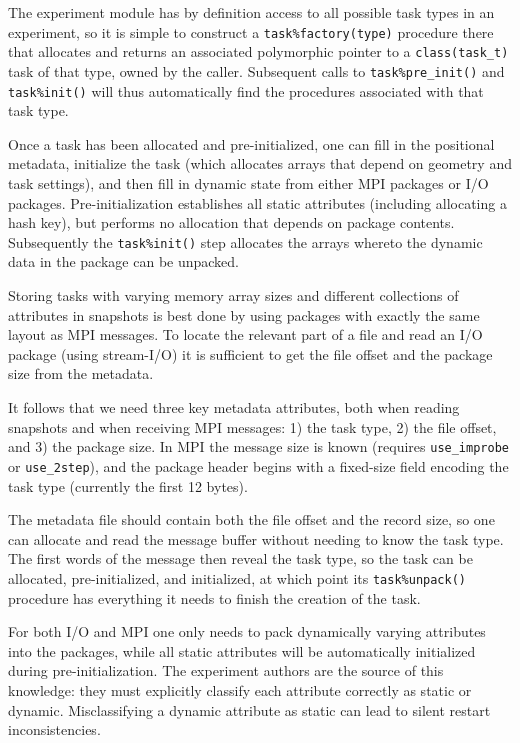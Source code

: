 \documentclass[paper=a4,fontsize=11pt]{scrartcl}
\numberwithin{equation}{section}		%
\numberwithin{figure}{section}			%
\numberwithin{table}{section}				%
\begin{document}
The experiment module has by definition access to all possible task types in an experiment, so it is simple to construct a \verb|task%factory(type)| procedure there that allocates and returns an associated polymorphic pointer to a \verb|class(task_t)| task of that type, owned by the caller.  Subsequent calls to \verb|task%pre_init()| and \verb|task%init()| will thus automatically find the procedures associated with that task type.

Once a task has been allocated and pre-initialized, one can fill in the positional metadata, initialize the task (which allocates arrays that depend on geometry and task settings), and then fill in dynamic state from either MPI packages or I/O packages.  Pre-initialization establishes all static attributes (including allocating a hash key), but performs no allocation that depends on package contents.  Subsequently the \verb|task%init()| step allocates the arrays whereto the dynamic data in the package can be unpacked.

Storing tasks with varying memory array sizes and different collections of attributes in snapshots is best done by using packages with exactly the same layout as MPI messages.  To locate the relevant part of a file and read an I/O package (using stream-I/O) it is sufficient to get the file offset and the package size from the metadata.

It follows that we need three key metadata attributes, both when reading snapshots and when receiving MPI messages: 1) the task type, 2) the file offset, and 3) the package size.  In MPI the message size is known (requires \verb|use_improbe| or \verb|use_2step|), and the package header begins with a fixed-size field encoding the task type (currently the first 12 bytes).

The metadata file should contain both the file offset and the record size, so one can allocate and read the message buffer without needing to know the task type.  The first words of the message then reveal the task type, so the task can be allocated, pre-initialized, and initialized, at which point its \verb|task%unpack()| procedure has everything it needs to finish the creation of the task.

For both I/O and MPI one only needs to pack dynamically varying attributes into the packages, while all static attributes will be automatically initialized during pre-initialization.  The experiment authors are the source of this knowledge: they must explicitly classify each attribute correctly as static or dynamic.  Misclassifying a dynamic attribute as static can lead to silent restart inconsistencies.
\end{document}
